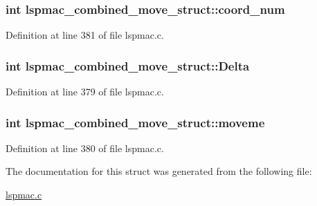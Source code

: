 \hypertarget{structlspmac__combined__move__struct_a2ae011832de3009f7a08b3081b51b7a3}{
\subsubsection[{coord\-\_\-num}]{\setlength{\rightskip}{0pt plus 5cm}int lspmac\-\_\-combined\-\_\-move\-\_\-struct\-::coord\-\_\-num}}\label{structlspmac__combined__move__struct_a2ae011832de3009f7a08b3081b51b7a3}


Definition at line 381 of file lspmac.\-c.

\hypertarget{structlspmac__combined__move__struct_a5389f07fcf2b24b0e912aefb4141001d}{
\subsubsection[{Delta}]{\setlength{\rightskip}{0pt plus 5cm}int lspmac\-\_\-combined\-\_\-move\-\_\-struct\-::\-Delta}}\label{structlspmac__combined__move__struct_a5389f07fcf2b24b0e912aefb4141001d}


Definition at line 379 of file lspmac.\-c.

\hypertarget{structlspmac__combined__move__struct_a650f35e534bd22bdb45d5361f75eaae8}{
\subsubsection[{moveme}]{\setlength{\rightskip}{0pt plus 5cm}int lspmac\-\_\-combined\-\_\-move\-\_\-struct\-::moveme}}\label{structlspmac__combined__move__struct_a650f35e534bd22bdb45d5361f75eaae8}


Definition at line 380 of file lspmac.\-c.



The documentation for this struct was generated from the following file\-:\begin{DoxyCompactItemize}
\item 
\hyperlink{lspmac_8c}{lspmac.\-c}\end{DoxyCompactItemize}
